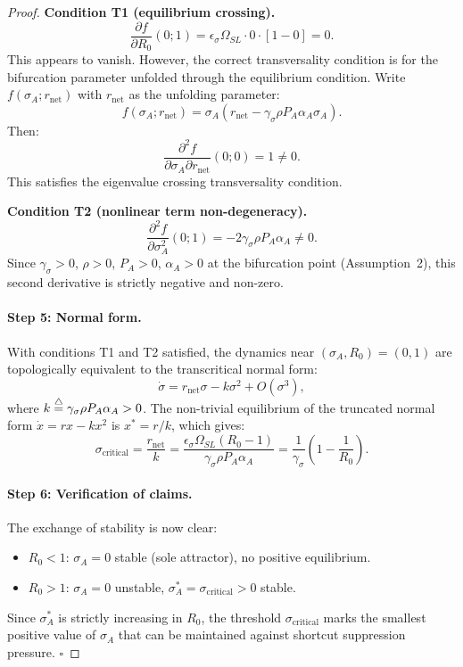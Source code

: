 \begin{proof}
\noindent\textbf{Condition T1 (equilibrium crossing).}
\[
\frac{\partial f}{\partial R_0}(0; 1) = \epsilon_\sigma \Omega_{SL} \cdot 0 \cdot [1 - 0] = 0.
\]
This appears to vanish. However, the correct transversality condition is
for the bifurcation parameter unfolded through the equilibrium condition.
Write $f(\sigma_A; r_{\text{net}})$ with $r_{\text{net}}$ as the unfolding
parameter:
\[
f(\sigma_A; r_{\text{net}}) = \sigma_A (r_{\text{net}} - \gamma_\sigma \rho P_A \alpha_A \sigma_A).
\]
Then:
\[
\frac{\partial^2 f}{\partial \sigma_A \partial r_{\text{net}}}(0; 0) = 1 \neq 0.
\]
This satisfies the eigenvalue crossing transversality condition.

\noindent\textbf{Condition T2 (nonlinear term non-degeneracy).}
\[
\frac{\partial^2 f}{\partial \sigma_A^2}(0; 1) = -2 \gamma_\sigma \rho P_A \alpha_A \neq 0.
\]
Since $\gamma_\sigma > 0$, $\rho > 0$, $P_A > 0$, $\alpha_A > 0$ at the
bifurcation point (Assumption~2), this second derivative is strictly
negative and non-zero.

\paragraph{Step 5: Normal form.}
With conditions T1 and T2 satisfied, the dynamics near $(\sigma_A, R_0) = (0, 1)$
are topologically equivalent to the transcritical normal form:
\[
\dot{\sigma} = r_{\text{net}} \sigma - k \sigma^2 + O(\sigma^3),
\]
where $k \stackrel{\triangle}{=} \gamma_\sigma \rho P_A \alpha_A > 0$. The non-trivial
equilibrium of the truncated normal form $\dot{x} = rx - kx^2$ is
$x^* = r/k$, which gives:
\[
\sigma_{\text{critical}} = \frac{r_{\text{net}}}{k}
= \frac{\epsilon_\sigma \Omega_{SL} (R_0 - 1)}{\gamma_\sigma \rho P_A \alpha_A}
= \frac{1}{\gamma_\sigma}\left(1 - \frac{1}{R_0}\right).
\]

\paragraph{Step 6: Verification of claims.}
The exchange of stability is now clear:
\begin{itemize}[nosep]
\item $R_0 < 1$: $\sigma_A = 0$ stable (sole attractor), no positive equilibrium.
\item $R_0 > 1$: $\sigma_A = 0$ unstable, $\sigma_A^* = \sigma_{\text{critical}} > 0$ stable.
\end{itemize}
Since $\sigma_A^*$ is strictly increasing in $R_0$, the threshold
$\sigma_{\text{critical}}$ marks the smallest positive value of $\sigma_A$
that can be maintained against shortcut suppression pressure. $\square$
\end{proof}

